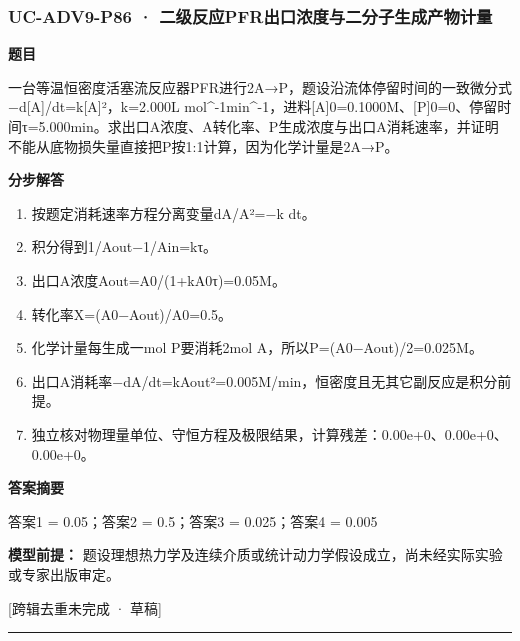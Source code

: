 \documentclass[UTF8,11pt,a4paper]{ctexart}
\begin{document}
\subsubsection*{UC-ADV9-P86 · 二级反应PFR出口浓度与二分子生成产物计量}
\noindent\textbf{题目}\par
一台等温恒密度活塞流反应器PFR进行2A→P，题设沿流体停留时间的一致微分式−d[A]/dt=k[A]²，k=2.000L mol\textasciicircum{}-1min\textasciicircum{}-1，进料[A]0=0.1000M、[P]0=0、停留时间τ=5.000min。求出口A浓度、A转化率、P生成浓度与出口A消耗速率，并证明不能从底物损失量直接把P按1:1计算，因为化学计量是2A→P。\par
\medskip\noindent\textbf{分步解答}
\begin{enumerate}
\item 按题定消耗速率方程分离变量dA/A²=−k dt。
\item 积分得到1/Aout−1/Ain=kτ。
\item 出口A浓度Aout=A0/(1+kA0τ)=0.05M。
\item 转化率X=(A0−Aout)/A0=0.5。
\item 化学计量每生成一mol P要消耗2mol A，所以P=(A0−Aout)/2=0.025M。
\item 出口A消耗率−dA/dt=kAout²=0.005M/min，恒密度且无其它副反应是积分前提。
\item 独立核对物理量单位、守恒方程及极限结果，计算残差：0.00e+0、0.00e+0、0.00e+0。
\end{enumerate}
\noindent\textbf{答案摘要}\par
答案1 = 0.05；答案2 = 0.5；答案3 = 0.025；答案4 = 0.005\par
\noindent\textbf{模型前提：}
题设理想热力学及连续介质或统计动力学假设成立，尚未经实际实验或专家出版审定。\par
\noindent\textcolor{red!65!black}{[跨辑去重未完成 · 草稿]} \par
\medskip\hrule\medskip
{}
\end{document}
